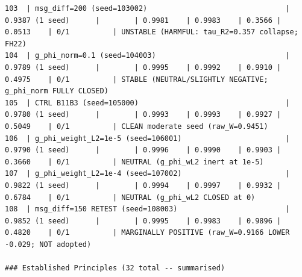\documentclass{article}
\begin{document}
\begin{tiny}
\begin{verbatim}
103  | msg_diff=200 (seed=103002)                                | 0.9387 (1 seed)      |        | 0.9981    | 0.9983    | 0.3566 | 0.0513    | 0/1          | UNSTABLE (HARMFUL: tau_R2=0.357 collapse; FH22)
104  | g_phi_norm=0.1 (seed=104003)                              | 0.9789 (1 seed)      |        | 0.9995    | 0.9992    | 0.9910 | 0.4975    | 0/1          | STABLE (NEUTRAL/SLIGHTLY NEGATIVE; g_phi_norm FULLY CLOSED)
105  | CTRL B11B3 (seed=105000)                                  | 0.9780 (1 seed)      |        | 0.9993    | 0.9993    | 0.9927 | 0.5049    | 0/1          | CLEAN moderate seed (raw_W=0.9451)
106  | g_phi_weight_L2=1e-5 (seed=106001)                        | 0.9790 (1 seed)      |        | 0.9996    | 0.9990    | 0.9903 | 0.3660    | 0/1          | NEUTRAL (g_phi_wL2 inert at 1e-5)
107  | g_phi_weight_L2=1e-4 (seed=107002)                        | 0.9822 (1 seed)      |        | 0.9994    | 0.9997    | 0.9932 | 0.6784    | 0/1          | NEUTRAL (g_phi_wL2 CLOSED at 0)
108  | msg_diff=150 RETEST (seed=108003)                         | 0.9852 (1 seed)      |        | 0.9995    | 0.9983    | 0.9896 | 0.4820    | 0/1          | MARGINALLY POSITIVE (raw_W=0.9166 LOWER -0.029; NOT adopted)

### Established Principles (32 total -- summarised)


\end{verbatim}
\end{tiny}
\end{document}
